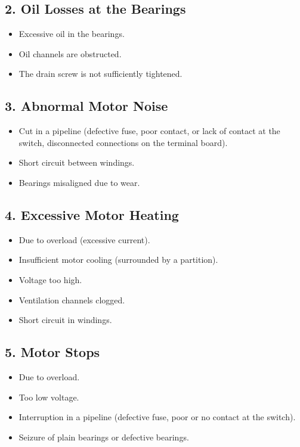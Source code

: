 \subsection*{2. Oil Losses at the Bearings}
\begin{itemize}
    \item Excessive oil in the bearings.
    \item Oil channels are obstructed.
    \item The drain screw is not sufficiently tightened.
\end{itemize}

\subsection*{3. Abnormal Motor Noise}
\begin{itemize}
    \item Cut in a pipeline (defective fuse, poor contact, or lack of contact at the switch, disconnected connections on the terminal board).
    \item Short circuit between windings.
    \item Bearings misaligned due to wear.
\end{itemize}

\subsection*{4. Excessive Motor Heating}
\begin{itemize}
    \item Due to overload (excessive current).
    \item Insufficient motor cooling (surrounded by a partition).
    \item Voltage too high.
    \item Ventilation channels clogged.
    \item Short circuit in windings.
\end{itemize}

\subsection*{5. Motor Stops}
\begin{itemize}
    \item Due to overload.
    \item Too low voltage.
    \item Interruption in a pipeline (defective fuse, poor or no contact at the switch).
    \item Seizure of plain bearings or defective bearings.
\end{itemize}

